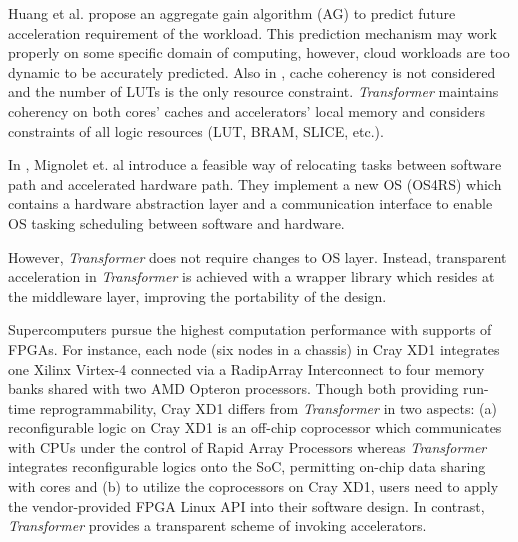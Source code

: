 Huang et al. propose an aggregate gain algorithm (AG)
\cite{Huang:2009hs} to predict future acceleration requirement of the
workload. This prediction mechanism may work properly on some specific
domain of computing, however, cloud workloads are too dynamic to be
accurately predicted. Also in \cite{Huang:2009hs}, cache coherency is not considered and the
number of LUTs is the only resource constraint. {\em Transformer}
maintains coherency on both cores' caches and accelerators' local
memory and considers constraints of all logic resources (LUT, BRAM,
SLICE, etc.).


In \cite{Mignolet:2003gr}, Mignolet et. al introduce a feasible way of
relocating tasks between software path and accelerated hardware
path. They implement a new OS (OS4RS) which contains a hardware
abstraction layer and a communication interface to enable OS tasking
scheduling between software and hardware. 

However, {\em Transformer} does not require changes to OS
layer. Instead, transparent acceleration in {\em Transformer} is
achieved with a wrapper library which resides at the middleware layer,
improving the portability of the design.


Supercomputers pursue the highest computation performance
\cite{Ulmer:2005vh} with supports of FPGAs. For instance, each node
(six nodes in a chassis) in Cray XD1 integrates one Xilinx Virtex-4
connected via a RadipArray Interconnect to four memory banks shared
with two AMD Opteron processors. Though both providing run-time
reprogrammability, Cray XD1 differs from {\em Transformer} in two
aspects: (a) reconfigurable logic on Cray XD1 is an off-chip
coprocessor which communicates with CPUs under the control of Rapid
Array Processors whereas {\em Transformer} integrates reconfigurable
logics onto the SoC, permitting on-chip data sharing with cores and (b)
to utilize the coprocessors on Cray XD1, users need to apply the
vendor-provided FPGA Linux API into their software design. In
contrast, {\em Transformer} provides a transparent scheme of invoking
accelerators.

